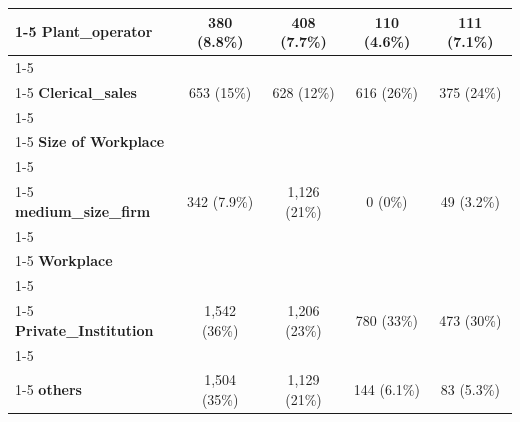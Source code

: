 \begin{table}[!h]
\begin{tabular}[t]{>{}l|c|c|c|c}
\cline{1-5}
\textbf{Plant\_operator} & 380 (8.8\%) & 408 (7.7\%) & 110 (4.6\%) & 111 (7.1\%)\\
\cline{1-5}
\textbf{\cellcolor{gray!10}{Agri\_trade}} & \cellcolor{gray!10}{1,657 (38\%)} & \cellcolor{gray!10}{1,766 (33\%)} & \cellcolor{gray!10}{156 (6.6\%)} & \cellcolor{gray!10}{44 (2.8\%)}\\
\cline{1-5}
\textbf{Clerical\_sales} & 653 (15\%) & 628 (12\%) & 616 (26\%) & 375 (24\%)\\
\cline{1-5}
\textbf{\cellcolor{gray!10}{Managers}} & \cellcolor{gray!10}{629 (14\%)} & \cellcolor{gray!10}{759 (14\%)} & \cellcolor{gray!10}{1,235 (52\%)} & \cellcolor{gray!10}{893 (57\%)}\\
\cline{1-5}
\textbf{Size of Workplace} &  &  &  & \\
\cline{1-5}
\textbf{\cellcolor{gray!10}{small\_size\_firm}} & \cellcolor{gray!10}{1,843 (42\%)} & \cellcolor{gray!10}{2,482 (47\%)} & \cellcolor{gray!10}{0 (0\%)} & \cellcolor{gray!10}{105 (6.8\%)}\\
\cline{1-5}
\textbf{medium\_size\_firm} & 342 (7.9\%) & 1,126 (21\%) & 0 (0\%) & 49 (3.2\%)\\
\cline{1-5}
\textbf{\cellcolor{gray!10}{large\_size\_firm}} & \cellcolor{gray!10}{2,154 (50\%)} & \cellcolor{gray!10}{1,664 (32\%)} & \cellcolor{gray!10}{2,379 (100\%)} & \cellcolor{gray!10}{1,401 (90\%)}\\
\cline{1-5}
\textbf{Workplace} &  &  &  & \\
\cline{1-5}
\textbf{\cellcolor{gray!10}{Government}} & \cellcolor{gray!10}{295 (6.8\%)} & \cellcolor{gray!10}{518 (9.8\%)} & \cellcolor{gray!10}{1,455 (61\%)} & \cellcolor{gray!10}{941 (61\%)}\\
\cline{1-5}
\textbf{Private\_Institution} & 1,542 (36\%) & 1,206 (23\%) & 780 (33\%) & 473 (30\%)\\
\cline{1-5}
\textbf{\cellcolor{gray!10}{Private\_Business}} & \cellcolor{gray!10}{998 (23\%)} & \cellcolor{gray!10}{2,419 (46\%)} & \cellcolor{gray!10}{0 (0\%)} & \cellcolor{gray!10}{58 (3.7\%)}\\
\cline{1-5}
\textbf{others} & 1,504 (35\%) & 1,129 (21\%) & 144 (6.1\%) & 83 (5.3\%)\\
\hline
\end{tabular}
\end{table}
